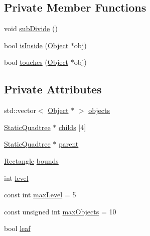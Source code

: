 \subsection*{Private Member Functions}
\begin{DoxyCompactItemize}
\item 
void \hyperlink{classZeta_1_1StaticQuadtree_aff2484ac4c3a89d6ac3f3a883e03b258}{sub\+Divide} ()
\item 
bool \hyperlink{classZeta_1_1StaticQuadtree_af930b82ce76d93375a5ab67151d4fa71}{is\+Inside} (\hyperlink{classZeta_1_1Object}{Object} $\ast$obj)
\item 
bool \hyperlink{classZeta_1_1StaticQuadtree_a198d4941d1a591e541ccc319d38ea27a}{touches} (\hyperlink{classZeta_1_1Object}{Object} $\ast$obj)
\end{DoxyCompactItemize}
\subsection*{Private Attributes}
\begin{DoxyCompactItemize}
\item 
std\+::vector$<$ \hyperlink{classZeta_1_1Object}{Object} $\ast$ $>$ \hyperlink{classZeta_1_1StaticQuadtree_a96f2f99c2fb37d79ae230ce0fd547f0d}{objects}
\item 
\hyperlink{classZeta_1_1StaticQuadtree}{Static\+Quadtree} $\ast$ \hyperlink{classZeta_1_1StaticQuadtree_a5525d75fb8f121ddc3c162a971146506}{childs} \mbox{[}4\mbox{]}
\item 
\hyperlink{classZeta_1_1StaticQuadtree}{Static\+Quadtree} $\ast$ \hyperlink{classZeta_1_1StaticQuadtree_adc1adf63b09a4d7d322602a72b89803d}{parent}
\item 
\hyperlink{classZeta_1_1Rectangle}{Rectangle} \hyperlink{classZeta_1_1StaticQuadtree_a753ee640c2596a4f83ec6d0f8e574e21}{bounds}
\item 
int \hyperlink{classZeta_1_1StaticQuadtree_a53059e324eaf43b4e55b55fa67cf9931}{level}
\item 
const int \hyperlink{classZeta_1_1StaticQuadtree_a048cc44a90aab6c8971d18c294da8648}{max\+Level} = 5
\item 
const unsigned int \hyperlink{classZeta_1_1StaticQuadtree_a18f3e883d1a83290f6290ae30fda27af}{max\+Objects} = 10
\item 
bool \hyperlink{classZeta_1_1StaticQuadtree_a9a02ad0fad2aa38f649769dd371467d4}{leaf}
\end{DoxyCompactItemize}


